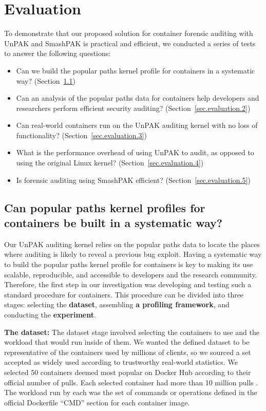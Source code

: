 \section{Evaluation}
\label{sec.evaluation}
To demonstrate that our proposed solution for container forensic auditing with UnPAK and SmashPAK is practical and efficient, 
we conducted a series of tests to answer the following questions: 
\begin{itemize}
	\item Can we build the popular paths kernel profile for containers in a systematic way? (Section~{\ref{sec.evaluation.1}})
	\item Can an analysis of the popular paths data for containers help developers and researchers perform efficient security auditing? (Section~{\ref{sec.evaluation.2}})
	\item Can real-world containers run on the UnPAK auditing kernel with no loss of functionality? (Section~{\ref{sec.evaluation.3}})
	\item What is the performance overhead of using UnPAK to audit, as opposed to using the original Linux kernel? (Section~{\ref{sec.evaluation.4}})
	\item Is forensic auditing using SmashPAK efficient? (Section~{\ref{sec.evaluation.5}})
\end{itemize}

\subsection{Can popular paths kernel profiles for containers be built in a systematic way?}
\label{sec.evaluation.1} 
Our UnPAK auditing kernel relies on the popular paths data to locate the places where auditing is likely to reveal a previous bug exploit. 
Having a systematic way to build the popular paths kernel profile for containers is key to making its use scalable, reproducible, and accessible to developers and the research community. 
Therefore, the first step in our investigation was developing and testing such a standard procedure for containers. 
This procedure can be divided into three stages: selecting the \textbf{dataset}, assembling \textbf{a profiling framework}, and conducting the \textbf{experiment}. 

\textbf{The dataset:} The dataset stage involved selecting the containers to use and the workload that would run inside of  them. 
We wanted the defined dataset to be representative of the containers used by millions of clients, so we sourced a set accepted as widely used according to trustworthy real-world statistics.  
We selected 50 containers deemed most popular on Docker Hub according to their official number of pulls. Each selected container had more than 10 million pulls \cite{DockerHub}. 
The workload run by each was the set of commands or operations defined in the official Dockerfile ``CMD'' section for each container image.

